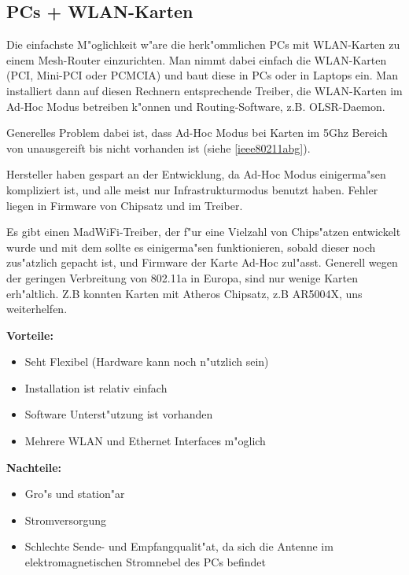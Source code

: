 \subsection{PCs + WLAN-Karten}

Die einfachste M"oglichkeit w"are die herk"ommlichen PCs mit WLAN-Karten
zu einem Mesh-Router einzurichten.
Man nimmt dabei einfach die WLAN-Karten (PCI, Mini-PCI oder PCMCIA) und
baut diese in PCs oder in Laptops ein. Man installiert dann auf diesen
Rechnern entsprechende Treiber, die WLAN-Karten im Ad-Hoc Modus betreiben
k"onnen und Routing-Software, z.B. OLSR-Daemon.

Generelles Problem dabei ist, dass Ad-Hoc Modus bei Karten im 5Ghz 
Bereich von unausgereift bis nicht vorhanden ist (siehe \ref{ieee80211abg}).

Hersteller haben gespart an der Entwicklung, da Ad-Hoc Modus
einigerma"sen kompliziert ist, und alle meist nur Infrastrukturmodus
benutzt haben. Fehler liegen in Firmware von Chipsatz und im Treiber.

Es gibt einen MadWiFi-Treiber, der f"ur eine Vielzahl von Chips"atzen
entwickelt wurde und mit dem sollte es einigerma"sen funktionieren, sobald
dieser noch zus"atzlich gepacht ist, und Firmware der Karte Ad-Hoc zul"asst.
Generell wegen der geringen Verbreitung von 802.11a in Europa, sind
nur wenige Karten erh"altlich. Z.B konnten Karten mit Atheros Chipsatz,
z.B AR5004X, uns weiterhelfen.

\textbf{Vorteile:}

\begin{itemize} 
\item Seht Flexibel (Hardware kann noch n"utzlich sein)
\item Installation ist relativ einfach
\item Software Unterst"utzung ist vorhanden
\item Mehrere WLAN und Ethernet Interfaces m"oglich 
\end{itemize}

\textbf{Nachteile: }
\begin{itemize}
\item Gro"s und station"ar
\item Stromversorgung 
\item Schlechte Sende- und Empfangqualit"at, da sich die Antenne im
elektromagnetischen Stromnebel des PCs befindet
\end{itemize}




